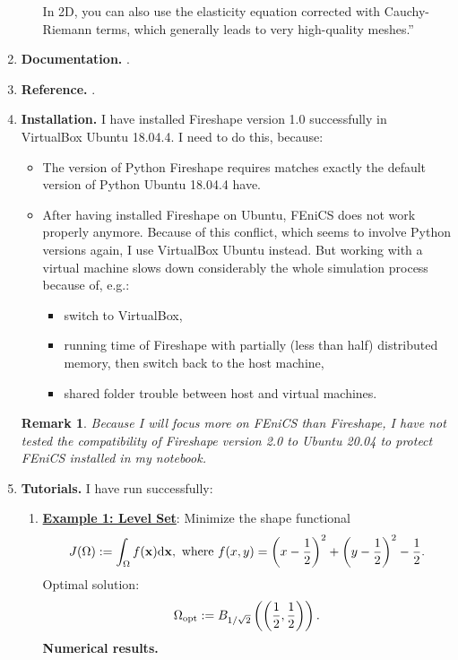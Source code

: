 \documentclass[onsided]{book}
\numberwithin{equation}{section}
\newtheorem{remark}{Remark}[section]
\begin{document}
\begin{enumerate}
\begin{itemize}
        In 2D, you can also use the elasticity equation corrected with Cauchy-Riemann terms, which generally leads to very high-quality meshes.''
    \end{itemize}
    \item \textbf{Documentation.} \cite{Paganini_Wechsung_Fireshape2020}.
    \item \textbf{Reference.} \cite{Paganini_Wechsung2020}.
    \item \textbf{Installation.} I have installed Fireshape version 1.0 successfully in VirtualBox Ubuntu 18.04.4. I need to do this, because:
    \begin{itemize}
        \item The version of Python Fireshape requires matches exactly the default version of Python Ubuntu 18.04.4 have.
        \item After having installed Fireshape on Ubuntu, FEniCS does not work properly anymore. Because of this conflict, which seems to involve Python versions again, I use VirtualBox Ubuntu instead. But working with a virtual machine slows down considerably the whole simulation process because of, e.g.:
        \begin{itemize}
            \item switch to VirtualBox,
            \item running time of Fireshape with partially (less than half) distributed memory, then switch back to the host machine,
            \item shared folder trouble between host and virtual machines.
        \end{itemize}
    \end{itemize}
    
    \begin{remark}
        Because I will focus more on FEniCS than Fireshape, I have not tested the compatibility of Fireshape version 2.0 to Ubuntu 20.04 to protect FEniCS installed in my notebook.
    \end{remark}
    \item \textbf{Tutorials.} I have run successfully:
    \begin{enumerate}
        \item \href{https://fireshape.readthedocs.io/en/latest/example_levelset.html#example-levelset}{\textbf{Example 1: Level Set}}: Minimize the shape functional
        \begin{align*}
            J(\Omega) := \int_\Omega f({\bf x}){\rm d}{\bf x}, \mbox{ where } f(x,y) = \left(x - \frac{1}{2}\right)^2 + \left(y - \frac{1}{2}\right)^2 - \frac{1}{2}.
        \end{align*}
        Optimal solution:
        \begin{align*}
            \Omega_{\rm opt} := B_{1/\sqrt{2}}\left(\left(\frac{1}{2},\frac{1}{2}\right)\right).
        \end{align*}
        \textbf{Numerical results.}
        

\end{enumerate}
\end{enumerate}
\end{document}
